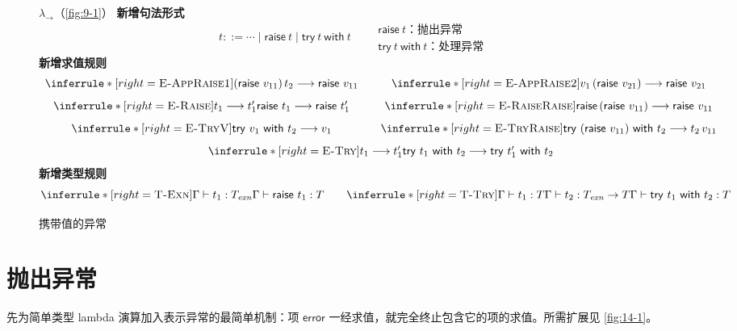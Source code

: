 \begin{figure}[!ht]
\centering
\begin{minipage}{0.99\linewidth}
\footnotesize
{}
  {\(\lambda_{\to}\)（\cref{fig:9-1}）}
\textbf{新增句法形式}
\[
t::=\cdots\mid\mathsf{raise}\ t
\mid\mathsf{try}\ t\ \mathsf{with}\ t
\qquad
\begin{array}{l}
\mathsf{raise}\ t\text{：抛出异常}\\
\mathsf{try}\ t\ \mathsf{with}\ t\text{：处理异常}
\end{array}
\]
\textbf{新增求值规则}
\[
\begin{array}{c@{\qquad}c}
\inferrule*[right=\textsc{E-AppRaise1}]
 { }{(\mathsf{raise}\ v_{11})\,t_2\trans\mathsf{raise}\ v_{11}}
&
\inferrule*[right=\textsc{E-AppRaise2}]
 { }{v_1\,(\mathsf{raise}\ v_{21})\trans\mathsf{raise}\ v_{21}}
\\[8pt]
\inferrule*[right=\textsc{E-Raise}]
 {t_1\trans t_1'}{\mathsf{raise}\ t_1\trans\mathsf{raise}\ t_1'}
&
\inferrule*[right=\textsc{E-RaiseRaise}]
 { }{\mathsf{raise}\,(\mathsf{raise}\ v_{11})
      \trans\mathsf{raise}\ v_{11}}
\\[8pt]
\inferrule*[right=\textsc{E-TryV}]
 { }{\mathsf{try}\ v_1\ \mathsf{with}\ t_2\trans v_1}
&
\inferrule*[right=\textsc{E-TryRaise}]
 { }{\mathsf{try}\ (\mathsf{raise}\ v_{11})\ \mathsf{with}\ t_2
      \trans t_2\,v_{11}}
\\[8pt]
\multicolumn{2}{c}{
\inferrule*[right=\textsc{E-Try}]
 {t_1\trans t_1'}
 {\mathsf{try}\ t_1\ \mathsf{with}\ t_2
  \trans\mathsf{try}\ t_1'\ \mathsf{with}\ t_2}}
\end{array}
\]
\textbf{新增类型规则}
\[
\inferrule*[right=\textsc{T-Exn}]
 {\Gamma\vdash t_1:T_{\mathit{exn}}}
 {\Gamma\vdash\mathsf{raise}\ t_1:T}
\qquad
\inferrule*[right=\textsc{T-Try}]
 {\Gamma\vdash t_1:T\\
  \Gamma\vdash t_2:T_{\mathit{exn}}\to T}
 {\Gamma\vdash\mathsf{try}\ t_1\ \mathsf{with}\ t_2:T}
\]
\end{minipage}
\par\medskip
\caption{携带值的异常}
\label{fig:14-3}
\end{figure}
\FloatBarrier

\section{抛出异常}
\label{sec:14.1}

先为简单类型 lambda 演算加入表示异常的最简单机制：项
\(\mathsf{error}\) 一经求值，就完全终止包含它的项的求值。所需扩展见
\cref{fig:14-1}。

